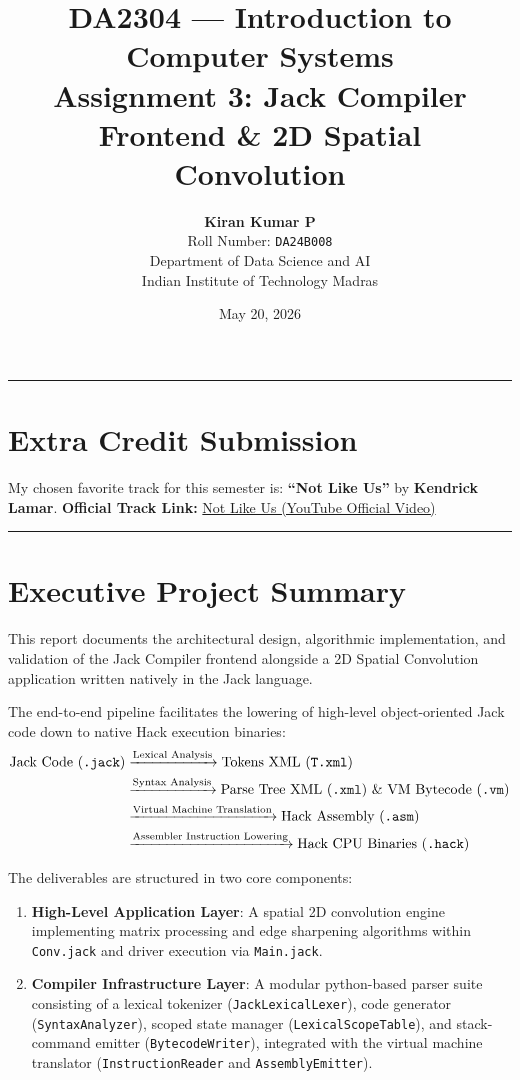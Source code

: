 \documentclass[11pt,a4paper]{article}
\title{%
    \vspace{-2em}
    \large\textbf{DA2304 --- Introduction to Computer Systems} \\
    \vspace{0.3em}
    \Large\textbf{Assignment 3: Jack Compiler Frontend \& 2D Spatial Convolution}
}
\author{%
    \textbf{Kiran Kumar P} \\
    Roll Number: \texttt{DA24B008} \\
    Department of Data Science and AI \\
    Indian Institute of Technology Madras
}
\date{\small May 20, 2026}
\begin{document}
\maketitle

\hrule
\vspace{1em}

\section*{Extra Credit Submission}
My chosen favorite track for this semester is:
\textbf{``Not Like Us''} by \textbf{Kendrick Lamar}.
\newline
\textbf{Official Track Link:} \href{https://youtu.be/T6eK-2OQtew}{Not Like Us (YouTube Official Video)}

\vspace{1em}
\hrule
\vspace{1.5em}

\section{Executive Project Summary}

This report documents the architectural design, algorithmic implementation, and validation of the Jack Compiler frontend alongside a 2D Spatial Convolution application written natively in the Jack language. 

The end-to-end pipeline facilitates the lowering of high-level object-oriented Jack code down to native Hack execution binaries:
\begin{align*}
\text{Jack Code (\texttt{.jack})} &\xrightarrow{\text{Lexical Analysis}} \text{Tokens XML (\texttt{T.xml})} \\
&\xrightarrow{\text{Syntax Analysis}} \text{Parse Tree XML (\texttt{.xml}) \& VM Bytecode (\texttt{.vm})} \\
&\xrightarrow{\text{Virtual Machine Translation}} \text{Hack Assembly (\texttt{.asm})} \\
&\xrightarrow{\text{Assembler Instruction Lowering}} \text{Hack CPU Binaries (\texttt{.hack})}
\end{align*}

The deliverables are structured in two core components:
\begin{enumerate}
    \item \textbf{High-Level Application Layer}: A spatial 2D convolution engine implementing matrix processing and edge sharpening algorithms within \texttt{Conv.jack} and driver execution via \texttt{Main.jack}.
    \item \textbf{Compiler Infrastructure Layer}: A modular python-based parser suite consisting of a lexical tokenizer (\texttt{JackLexicalLexer}), code generator (\texttt{SyntaxAnalyzer}), scoped state manager (\texttt{LexicalScopeTable}), and stack-command emitter (\texttt{BytecodeWriter}), integrated with the virtual machine translator (\texttt{InstructionReader} and \texttt{AssemblyEmitter}).
\end{enumerate}
\end{document}

